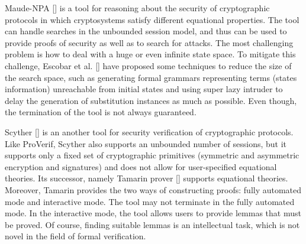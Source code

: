\documentclass[a4paper,fleqn]{cas-dc}
\begin{document}
Maude-NPA [\cite{maudenpa}] is a tool for reasoning about the security of cryptographic protocols in which cryptosystems satisfy different equational properties.
The tool can handle searches in the unbounded session model, and thus can be used to provide proofs of security as well as to search for attacks.
The most challenging problem is how to deal with a huge or even infinite state space.
To mitigate this challenge, Escobar et al. [\cite{maudenpa08}] have proposed some techniques to reduce the size of the search space, such as generating formal grammars representing terms (states information) unreachable from initial states and using super lazy intruder to delay the generation of substitution instances as much as possible.
Even though, the termination of the tool is not always guaranteed.

Scyther [\cite{Scyther08}] is an another tool for security verification of cryptographic protocols.
Like ProVerif, Scyther also supports an unbounded number of sessions, but it supports only a fixed set of cryptographic primitives (symmetric and asymmetric encryption and signatures) and does not allow for user-specified equational theories.
Its successor, namely Tamarin prover [\cite{tamarin}] supports equational theories.
Moreover, Tamarin  provides the two ways of constructing proofs: fully automated mode and interactive mode. 
The tool may not terminate in the fully automated mode.
In the interactive mode, the tool allows users to provide lemmas that must be proved. 
Of course, finding suitable lemmas is an intellectual task, which is not novel in the field of formal verification.
\end{document}
